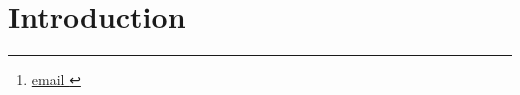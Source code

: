 \documentclass[a4paper,draft]{article}
\title{}
\author{{{ name }}%
    \thanks{\href{mailto:{{ email }}}{{{ email }}}}%
            \\ \textit{{{ inst }}}%
        }
\date{\today}
\begin{document}
\maketitle

\section{Introduction}



\end{document}
